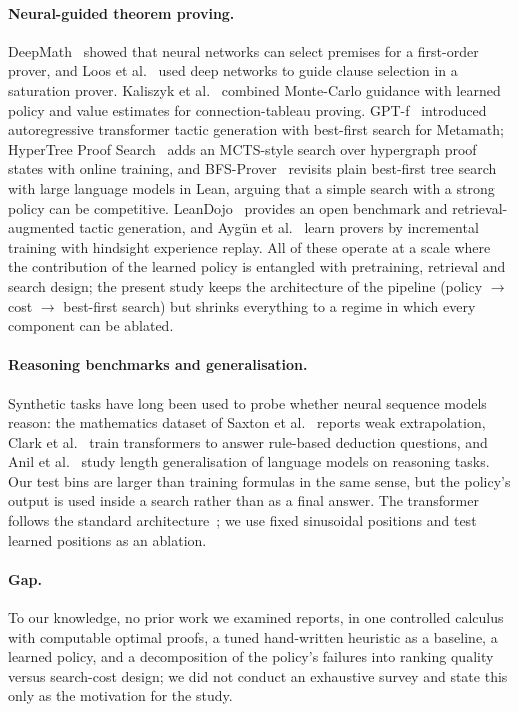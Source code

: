 \paragraph{Neural-guided theorem proving.} DeepMath~\cite{alemi2016deepmath} showed that neural networks can select premises for a first-order prover, and Loos et al.~\cite{loos2017deep} used deep networks to guide clause selection in a saturation prover. Kaliszyk et al.~\cite{kaliszyk2018reinforcement} combined Monte-Carlo guidance with learned policy and value estimates for connection-tableau proving. GPT-f~\cite{polu2020generative} introduced autoregressive transformer tactic generation with best-first search for Metamath; HyperTree Proof Search~\cite{lample2022hypertree} adds an MCTS-style search over hypergraph proof states with online training, and BFS-Prover~\cite{xin2025bfs} revisits plain best-first tree search with large language models in Lean, arguing that a simple search with a strong policy can be competitive. LeanDojo~\cite{yang2023leandojo} provides an open benchmark and retrieval-augmented tactic generation, and Aygün et al.~\cite{aygn2021proving} learn provers by incremental training with hindsight experience replay. All of these operate at a scale where the contribution of the learned policy is entangled with pretraining, retrieval and search design; the present study keeps the architecture of the pipeline (policy $\rightarrow$ cost $\rightarrow$ best-first search) but shrinks everything to a regime in which every component can be ablated.

\paragraph{Reasoning benchmarks and generalisation.} Synthetic tasks have long been used to probe whether neural sequence models reason: the mathematics dataset of Saxton et al.~\cite{saxton2019analysing} reports weak extrapolation, Clark et al.~\cite{clark2020transformers} train transformers to answer rule-based deduction questions, and Anil et al.~\cite{anil2022exploring} study length generalisation of language models on reasoning tasks. Our test bins are larger than training formulas in the same sense, but the policy's output is used inside a search rather than as a final answer. The transformer follows the standard architecture~\cite{vaswani2017attention}; we use fixed sinusoidal positions and test learned positions as an ablation.

\paragraph{Gap.} To our knowledge, no prior work we examined reports, in one controlled calculus with computable optimal proofs, a tuned hand-written heuristic as a baseline, a learned policy, and a decomposition of the policy's failures into ranking quality versus search-cost design; we did not conduct an exhaustive survey and state this only as the motivation for the study.
